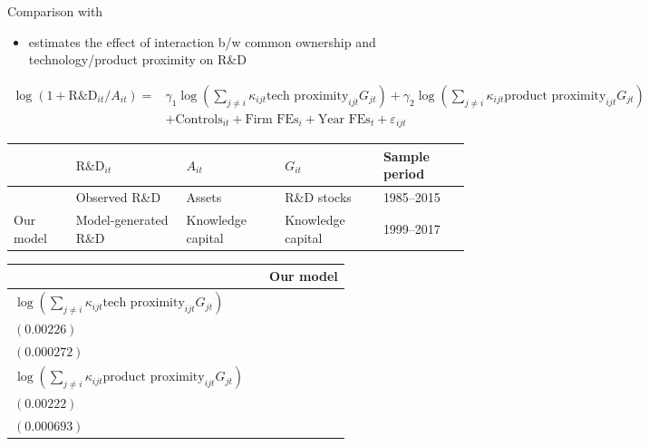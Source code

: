 \documentclass[
  10pt,
  aspectratio=169,   %
]{beamer}
\theoremstyle{plain}
\begin{document}
\begin{frame}{Comparison with \cite{Anton2024-pw}}
  \begin{itemize}
    \item \citet{Anton2024-pw} estimates the effect of interaction b/w common ownership and technology/product proximity on R\&D
  \end{itemize}
  \footnotesize{
    \begin{align*}
      \log\left(1+\text{R\&D}_{it}/A_{it}\right) = & \gamma_1 \log \left(\sum_{j \neq i} \kappa_{ijt} \text{tech proximity}_{ijt} G_{jt}\right) + \gamma_2 \log \left(\sum_{j \neq i} \kappa_{ijt} \text{product proximity}_{ijt} G_{jt}\right) \\  & + \text{Controls}_{it} + \text{Firm FEs}_i + \text{Year FEs}_t + \varepsilon_{ijt}
    \end{align*}
  }
  \begin{table}[h]
    \centering
    \footnotesize
    \begin{tabular}{@{}l l l l l@{}}
      \toprule
      & $\text{R\&D}_{it}$  & $A_{it}$          & $G_{it}$         & Sample period \\
      \midrule
      \cite{Anton2024-pw} & Observed R\&D & Assets            & R\&D stocks        & 1985--2015    \\
      Our model           & Model-generated R\&D& Knowledge capital & Knowledge capital & 1999--2017    \\
      \bottomrule
    \end{tabular}
  \end{table}
  \pause
  \begin{table}[h]
    \centering
    \footnotesize
    \begin{tabular}{@{}l cc@{}}
      \toprule
                                                                                             & \cite{Anton2024-pw}           & Our model \\
      \midrule
      $\log \left(\sum_{j \neq i} \kappa_{ijt} \text{tech proximity}_{ijt} G_{jt}\right)$    & \shortstack{$0.00513^{**}$ \\ $(0.00226)$} & \shortstack{$0.00194^{***}$ \\ $(0.000272)$} \\
      $\log \left(\sum_{j \neq i} \kappa_{ijt} \text{product proximity}_{ijt} G_{jt}\right)$ & \shortstack{$-0.00457^{**}$ \\ $(0.00222)$} & \shortstack{$-0.00547^{***}$ \\ $(0.000693)$} \\
      \bottomrule
    \end{tabular}
  \end{table}
\end{frame}
\end{document}
